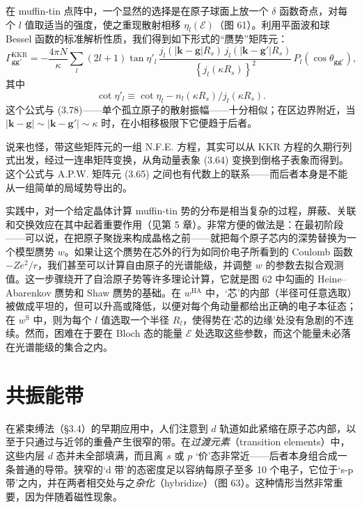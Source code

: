 
在 muffin-tin 点阵中，一个显然的选择是在原子球面上放一个 $\delta$ 函数奇点，对每个 $l$ 值取适当的强度，使之重现散射相移 $\eta_l(\mathcal{E})$（图 61）。利用平面波和球 Bessel 函数的标准解析性质，我们得到如下形式的“赝势”矩阵元：
\begin{equation*}
\Gamma^{\mathrm{KKR}}_{\mathbf{gg}'}=-\frac{4\pi N}{\kappa}\sum_l(2l+1)\tan\eta'_l\,\frac{j_l(|\mathbf{k}-\mathbf{g}|R_s)\,j_l(|\mathbf{k}-\mathbf{g}'|R_s)}{\left\{j_l(\kappa R_s)\right\}^2}\,P_l(\cos\theta_{\mathbf{gg}'}),\tag{3.79}
\end{equation*}
其中
\begin{equation*}
\cot\eta'_l\equiv\cot\eta_l-n_l(\kappa R_s)\big/j_l(\kappa R_s).\tag{3.80}
\end{equation*}
这个公式与 (3.78)——单个孤立原子的散射振幅——十分相似；在区边界附近，当 $|\mathbf{k}-\mathbf{g}|\sim|\mathbf{k}-\mathbf{g}'|\sim\kappa$ 时，在小相移极限下它便趋于后者。

说来也怪，带这些矩阵元的一组 N.F.E. 方程，其实可以从 KKR 方程的久期行列式出发，经过一连串矩阵变换，从角动量表象 (3.64) 变换到倒格子表象而得到。这个公式与 A.P.W. 矩阵元 (3.65) 之间也有代数上的联系——而后者本身是不能从一组简单的局域势导出的。

实践中，对一个给定晶体计算 muffin-tin 势的分布是相当复杂的过程，屏蔽、关联和交换效应在其中起着重要作用（见第 5 章）。非常方便的做法是：在最初阶段——可以说，在把原子聚拢来构成晶格之前——就把每个原子芯内的深势替换为一个模型赝势 $w$。如果让这个赝势在芯外的行为如同价电子所看到的 Coulomb 函数 $-Ze^2/r$，我们甚至可以计算自由原子的光谱能级，并调整 $w$ 的参数去拟合观测值。这一步骤绕开了自洽原子势等许多理论计算，它就是图 62 中勾画的 Heine–Abarenkov 赝势和 Shaw 赝势的基础。在 $w^{\mathrm{HA}}$ 中，‘芯’的内部（半径可任意选取）被做成平坦的，但可以升高或降低，以便对每个角动量都给出正确的电子本征态；在 $w^{\mathrm{S}}$ 中，则为每个 $l$ 值选取一个半径 $R_l$，使得势在‘芯的边缘’处没有急剧的不连续。然而，困难在于要在 Bloch 态的能量 $\mathcal{E}$ 处选取这些参数，而这个能量未必落在光谱能级的集合之内。


\section{共振能带}

在紧束缚法（§3.4）的早期应用中，人们注意到 $d$ 轨道如此紧缩在原子芯内部，以至于只通过与近邻的重叠产生很窄的带。在\emph{过渡元素}（transition elements）中，这些内层 $d$ 态并未全部填满，而且离 $s$ 或 $p$ ‘价’态非常近——后者本身组合成一条普通的导带。狭窄的‘d 带’的态密度足以容纳每原子至多 10 个电子，它位于‘s-p 带’之内，并在两者相交处与之\emph{杂化}（hybridize）（图 63）。这种情形当然非常重要，因为伴随着磁性现象。

